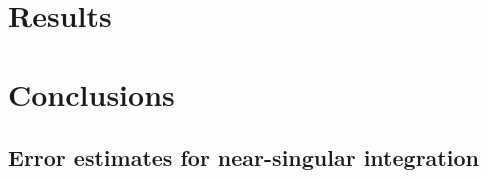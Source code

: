 \documentclass[preprint, 10pt]{elsarticle}
\begin{document}
\section{Results\label{s:results}} 

\section{Conclusions\label{s:conclusions}}


\begin{appendices}
\section{Error estimates for near-singular integration \label{A:AppendixA}} 
\end{appendices}


 

\end{document}
